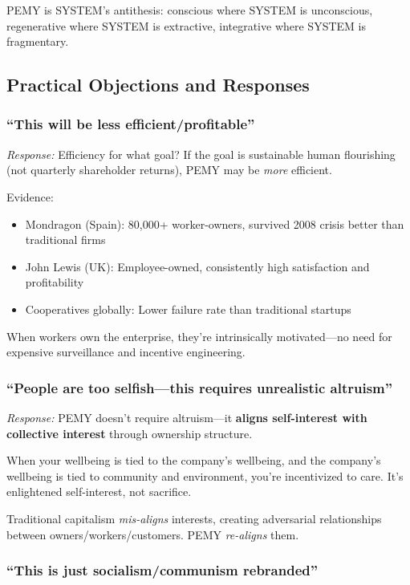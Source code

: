 \documentclass[11pt,a4paper]{article}
\theoremstyle{definition}
\theoremstyle{remark}
\begin{document}
PEMY is SYSTEM's antithesis: conscious where SYSTEM is unconscious, regenerative where SYSTEM is extractive, integrative where SYSTEM is fragmentary.

\subsection{Practical Objections and Responses}

\subsubsection{``This will be less efficient/profitable''}

\textit{Response:} Efficiency for what goal? If the goal is sustainable human flourishing (not quarterly shareholder returns), PEMY may be \textit{more} efficient.

Evidence:
\begin{itemize}
    \item Mondragon (Spain): 80,000+ worker-owners, survived 2008 crisis better than traditional firms
    \item John Lewis (UK): Employee-owned, consistently high satisfaction and profitability
    \item Cooperatives globally: Lower failure rate than traditional startups
\end{itemize}

When workers own the enterprise, they're intrinsically motivated---no need for expensive surveillance and incentive engineering.

\subsubsection{``People are too selfish---this requires unrealistic altruism''}

\textit{Response:} PEMY doesn't require altruism---it \textbf{aligns self-interest with collective interest} through ownership structure.

When your wellbeing is tied to the company's wellbeing, and the company's wellbeing is tied to community and environment, you're incentivized to care. It's enlightened self-interest, not sacrifice.

Traditional capitalism \textit{mis-aligns} interests, creating adversarial relationships between owners/workers/customers. PEMY \textit{re-aligns} them.

\subsubsection{``This is just socialism/communism rebranded''}
\end{document}
